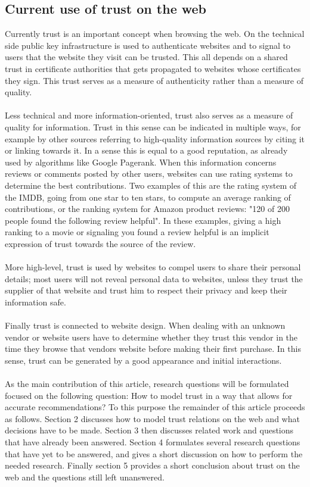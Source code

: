 \documentclass{llncs}
\begin{document}
\subsection{Current use of trust on the web}
Currently trust is an important concept when browsing the web. On the technical side public key infrastructure is used to authenticate websites and to signal to users that the website they visit can be trusted. This all depends on a shared trust in certificate authorities that gets propagated to websites whose certificates they sign. This trust serves as a measure of authenticity rather than a measure of quality.\\
\\
Less technical and more information-oriented, trust also serves as a measure of quality for information.\cite{Artz2007} Trust in this sense can be indicated in multiple ways, for example by other sources referring to high-quality information sources by citing it or linking towards it. In a sense this is equal to a good reputation, as already used by algorithms like Google Pagerank.
When this information concerns reviews or comments posted by other users, websites can use rating systems to determine the best contributions. Two examples of this are the rating system of the IMDB, going from one star to ten stars, to compute an average ranking of contributions, or the ranking system for Amazon product reviews: "120 of 200 people found the following review helpful". In these examples, giving a high ranking to a movie or signaling you found a review helpful is an implicit expression of trust towards the source of the review.\\
\\
More high-level, trust is used by websites to compel users to share their personal details; most users will not reveal personal data to websites, unless they trust the supplier of that website and trust him to respect their privacy and keep their information safe.\cite{Hoebel2011}\\
\\
Finally trust is connected to website design. When dealing with an unknown vendor or website users have to determine whether they trust this vendor in the time they browse that vendors website before making their first purchase.\cite{HarrisonMcKnight2002} In this sense, trust can be generated by a good appearance and initial interactions.\\
\\
As the main contribution of this article, research questions will be formulated focused on the following question: How to model trust in a way that allows for accurate recommendations? To this purpose the remainder of this article proceeds as follows. Section 2 discusses how to model trust relations on the web and what decisions have to be made. Section 3 then discusses related work and questions that have already been answered. Section 4 formulates several research questions that have yet to be answered, and gives a short discussion on how to perform the needed research. Finally section 5 provides a short conclusion about trust on the web and the questions still left unanswered.
\end{document}
